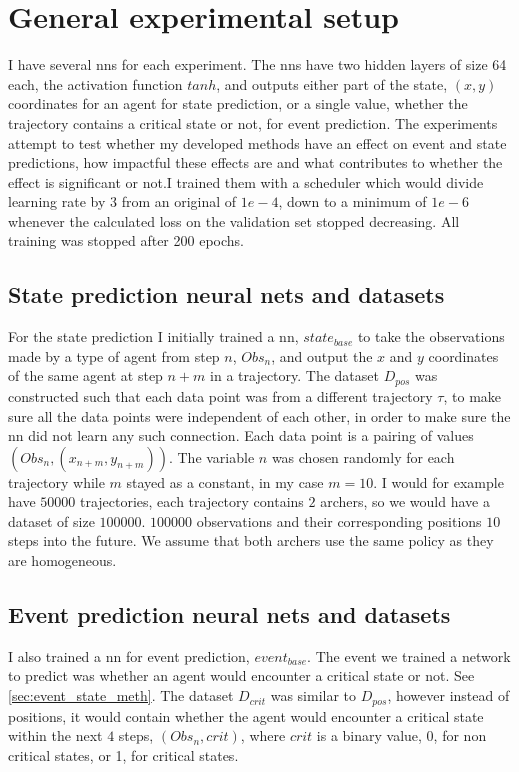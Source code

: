 \documentclass[UKenglish]{uiomasterthesis}
\begin{document}
\section{General experimental setup}
I have several \acp{nn} for each experiment. The \acp{nn} have two hidden layers of size 64 each, the activation function $tanh$, and outputs either part of the state, $(x,y)$ coordinates for an agent for state prediction, or a single value, whether the trajectory contains a critical state or not, for event prediction. The experiments attempt to test whether my developed methods have an effect on event and state predictions, how impactful these effects are and what contributes to whether the effect is significant or not.I trained them with a scheduler which would divide learning rate by $3$ from an original of $1e-4$, down to a minimum of $1e-6$ whenever the calculated loss on the validation set stopped decreasing. All training was stopped after 200 epochs.

\subsection{State prediction neural nets and datasets}
For the state prediction I initially trained a \ac{nn}, $state_{base}$ to take the observations made by a type of agent from step $n$, $Obs_n$, and output the $x$ and $y$ coordinates of the same agent at step $n+m$ in a trajectory. The dataset $D_{pos}$ was constructed such that each data point was from a different trajectory $\tau$, to make sure all the data points were independent of each other, in order to make sure the \ac{nn} did not learn any such connection. Each data point is a pairing of values $(Obs_n, (x_{n+m},y_{n+m}))$. The variable $n$ was chosen randomly for each trajectory while $m$ stayed as a constant, in my case $m=10$. I would for example have $50000$ trajectories, each trajectory contains $2$ archers, so we would have a dataset of size $100000$. $100000$ observations and their corresponding positions $10$ steps into the future. We assume that both archers use the same policy as they are homogeneous.

\subsection{Event prediction neural nets and datasets}
I also trained a \ac{nn} for event prediction, $event_{base}$. The event we trained a network to predict was whether an agent would encounter a critical state or not. See \cref{sec:event_state_meth}. The dataset $D_{crit}$ was similar to $D_{pos}$, however instead of positions, it would contain whether the agent would encounter a critical state within the next $4$ steps, $(Obs_n, crit)$, where $crit$ is a binary value, 0, for non critical states, or 1, for critical states.
\end{document}
